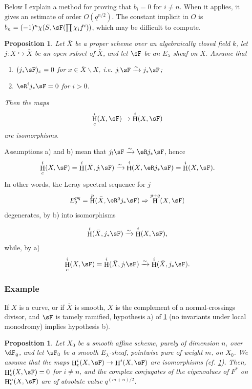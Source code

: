 \documentclass[oneside]{book}
\DeclareMathOperator{\h}{H}
\DeclareMathOperator{\hh}{\mathsf{H}} %
\newcommand{\iso}{\xrightarrow\sim}
\renewcommand{\setminus}{\smallsetminus}
\theoremstyle{sga-source}
\theoremstyle{sga-source-dash}
\theoremstyle{sga-source-dotdash}
\theoremstyle{sga-source-number-note-dash}
\theoremstyle{sga-source-note-number-dotdash}
\theoremstyle{sga-source-example-dotdash}
\theoremstyle{sga-source-inline-number}
\theoremstyle{sga-source-bare-number}
\theoremstyle{sga-source}
\newtheorem{proposition_}[subsection]{Proposition}
\newcommand{\PrintPage}[1]{}\newcommand{\MathPage}[1]{}\newcommand{\PrintCite}[2]{#1}\newcommand{\var}[3]{#2}
\begin{document}
Below I explain a method for proving that $b_i=0$ for $i\ne n$. 
When it applies, it gives an estimate of order $O(q^{n/2})$. The constant 
implicit in $O$ is $b_n=(-1)^n \chi(S,\sF(\prod \chi_i f^i))$, which may 
be difficult to compute. 





\begin{proposition_}\label{VI:1-19}
Let $\bar X$ be a proper scheme over an algebraically closed field $k$, 
let $j:X\hookrightarrow \bar X$ be \var{an open subset of $X$}{an open subset of $\bar X$}{S45-SOL-0719}, and let $\sF$ be an $E_\lambda$-sheaf 
on $X$. Assume that 
\begin{enumerate}[\indent a)]
  \item $(j_\ast\sF)_x = 0$ for $x\in \bar X\setminus X$, i.e. 
    $j_!\sF\iso j_\ast\sF$; 
  \item $\eR^i j_\ast \sF = 0$ for $i>0$.
\end{enumerate}
Then the maps 
\[
  \h_c^i(X,\sF) \to \h^i(X,\sF)
\]
are isomorphisms. 
\end{proposition_}

Assumptions a) and b) mean that $j_! \sF \iso \eR j_\ast \sF$, hence 
\[
  \h_c^i(X,\sF) = \h^i(\bar X,j_!\sF) \iso \hh^i(\bar X,\eR j_\ast \sF) = \h^i(X,\sF) \text{.}
\]
In other words, the Leray spectral sequence for $j$ 
\[
  E_2^{pq} = \h^p(\bar X,\eR^q j_\ast \sF) \Rightarrow \h^{p+q}(X,\sF) 
\]
degenerates, by b) into isomorphisms 
\PrintPage{180}
\[
  \h^i(\bar X,j_\ast\sF) \iso \h^i(X,\sF) \text{,}
\]
while, by a) 
\[
  \h_c^i(X,\sF) = \h^i(\bar X,j_!\sF) \iso \h^i(\bar X,j_\ast\sF) \text{.}
\]





\subsubsection{Example}\label{VI:1-19-1}

If $X$ is a curve, or if $\bar X$ is smooth, $X$ is the complement of a 
normal-crossings divisor, and $\sF$ is tamely ramified, 
hypothesis a) of \ref{VI:1-19} (no invariants under local monodromy) 
implies hypothesis b). 





\begin{proposition_}\label{VI:1-20}
Let $X_0$ be a smooth affine scheme, purely of dimension $n$, over $\dF_q$, and let 
$\sF_0$ be a smooth $E_\lambda$-sheaf, pointwise pure of weight $m$, on $X_0$. We 
assume that the maps $\h_c^i(X,\sF) \to \h^i(X,\sF)$ are 
isomorphisms \var{(cf. \ref{VI:1-17})}{(cf. \ref{VI:1-19})}{S45-SOL-0721}. Then, $\h_c^i(X,\sF) = 0$ for $i\ne n$, and 
the complex conjugates of the eigenvalues of $F^\ast$ on $\h_c^n(X,\sF)$ 
are of absolute value $q^{(m+n)/2}$. 
\end{proposition_}
\end{document}
